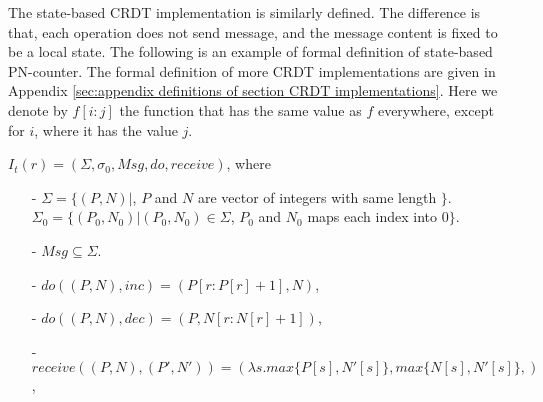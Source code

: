 {The state-based CRDT implementation is similarly defined. The difference is that, each operation does not send message, and the message content is fixed to be a local state. The following is an example of formal definition of state-based PN-counter. The formal definition of more CRDT implementations are given in Appendix \ref{sec:appendix definitions of section CRDT implementations}. Here we denote by $f[i:j]$ the function that has the same value as $f$ everywhere, except for $i$, where it has the value $j$. %

\begin{example}
\label{definition:formal definition of state-based PN-counter}
$I_t(r) = (\Sigma, \sigma_0, \mathit{Msg}, \mathit{do},\mathit{receive})$, where

\begin{itemize}
\setlength{\itemsep}{0.5pt}
\item[-] $\Sigma = \{ (P,N) \vert$, $P$ and $N$ are vector of integers with same length $\}$. $\Sigma_0 = \{ (P_0,N_0) \vert (P_0,N_0) \in \Sigma$, $P_0$ and $N_0$ maps each index into $0 \}$.

\item[-] $\mathit{Msg} \subseteq \Sigma$.

\item[-] $\mathit{do}((P,N),\mathit{inc}) = (P[r:P[r]+1],N)$,

\item[-] $\mathit{do}((P,N),\mathit{dec}) = (P,N[r:N[r]+1])$,

\item[-] $\mathit{receive}((P,N),(P',N')) = (\lambda s. \mathit{max}\{  P[s], N'[s] \}, \mathit{max}\{  N[s], N'[s] \},)$,
\end{itemize}
\end{example}
}































